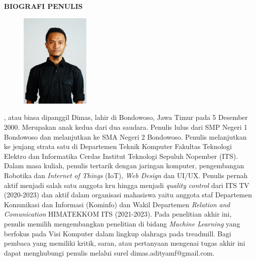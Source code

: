 \begin{center}
  \Large
  \textbf{BIOGRAFI PENULIS}
\end{center}


\vspace{2ex}

\begin{figure}
  \centering
  \vspace{-3ex}
  \includegraphics[width=0.3\textwidth]{gambar/biodimas.jpg}
  \vspace{-4ex}
\end{figure}

\name{}, atau biasa dipanggil Dimas, lahir di Bondowoso, Jawa Timur pada 5 Desember 2000. Merupakan anak kedua dari dua saudara. Penulis lulus dari SMP Negeri 1 Bondowoso dan melanjutkan ke SMA Negeri 2 Bondowoso. Penulis melanjutkan ke jenjang strata satu di Departemen Teknik Komputer Fakultas Teknologi Elektro dan Informatika Cerdas Institut Teknologi Sepuluh Nopember (ITS). Dalam masa kuliah, penulis tertarik dengan jaringan komputer, pengembangan Robotika dan \emph{Internet of Things} (IoT), \emph{Web Design} dan UI/UX. Penulis pernah aktif menjadi salah satu anggota kru hingga menjadi \emph{quality control} dari ITS TV (2020-2023) dan aktif dalam organisasi mahasiswa yaitu anggota staf Departemen Komunikasi dan Informasi (Kominfo) dan Wakil Departemen \emph{Relation and Comunication} HIMATEKKOM ITS (2021-2023). Pada penelitian akhir ini, penulis memilih mengembangkan penelitian di bidang \emph{Machine Learning} yang berfokus pada Visi Komputer dalam lingkup olahraga pada treadmill. Bagi pembaca yang memiliki kritik, saran, atau pertanyaan mengenai tugas akhir ini dapat menghubungi penulis melalui surel dimas.adityamf@gmail.com.

